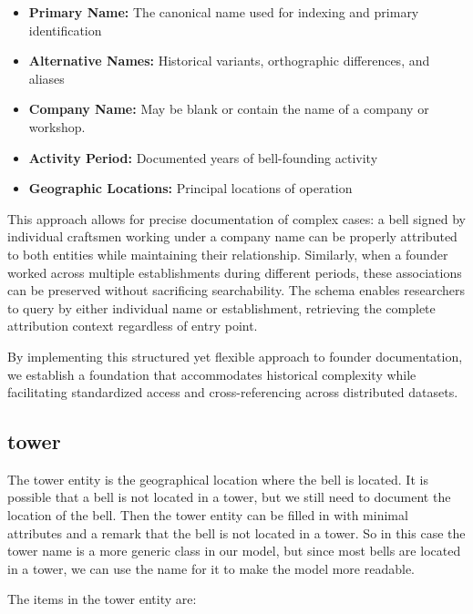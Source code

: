 \documentclass[11pt, a4paper]{article}
\begin{document}
\begin{itemize}
\begin{itemize}
    \item \textbf{Primary Name:} The canonical name used for indexing and primary identification
    \item \textbf{Alternative Names:} Historical variants, orthographic differences, and aliases
    \item \textbf{Company Name:} May be blank or contain the name of a company or workshop.
    \item \textbf{Activity Period:} Documented years of bell-founding activity
    \item \textbf{Geographic Locations:} Principal locations of operation
\end{itemize}

This approach allows for precise documentation of complex cases: a bell signed by individual craftsmen working under a company name 
can be properly attributed to both entities while maintaining their relationship. Similarly, when a founder worked across multiple 
establishments during different periods, these associations can be preserved without sacrificing searchability. 
The schema enables researchers to query by either individual name or establishment, retrieving the complete attribution context 
regardless of entry point.

By implementing this structured yet flexible approach to founder documentation, we establish a foundation that accommodates 
historical complexity while facilitating standardized access and cross-referencing across distributed datasets.

\subsection{tower}

The tower entity is the geographical location where the bell is located. It is possible that a bell is not located in a tower, but
we still need to document the location of the bell. Then the tower entity can be filled in with minimal attributes and a remark that
the bell is not located in a tower. So in this case the tower name is a more generic class in our model, but since most bells are located 
in a tower, we can use the name for it to make the model more readable.

The items in the tower entity are:


\end{itemize}
\end{document}
